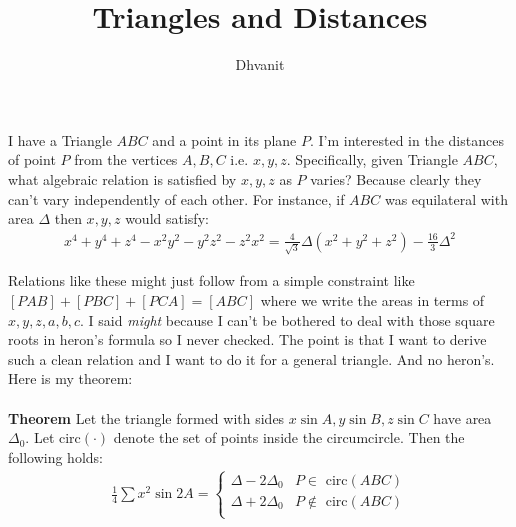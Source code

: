 \documentclass{article}
\title{Triangles and Distances}
\author{Dhvanit}
\begin{document}
\maketitle

\begin{center}
\end{center}
I have a Triangle $ABC$ and a point in its plane $P$. I'm interested in the distances of point $P$ from the vertices $A,B,C$ i.e. $x,y,z$. Specifically, given Triangle $ABC$, what algebraic relation is satisfied by $x,y,z$ as $P$ varies? Because clearly they can't vary independently of each other. For instance, if $ABC$ was equilateral with area $\Delta$ then $x,y,z$ would satisfy:
\begin{align}
    x^4+y^4+z^4 - x^2y^2-y^2z^2-z^2x^2 = \frac{4}{\sqrt{3}}\Delta\left(x^2+y^2+z^2 \right)- \frac{16}{3}\Delta^2
\end{align}

Relations like these might just follow from a simple constraint like $[PAB]+[PBC]+[PCA] = [ABC]$ where we write the areas in terms of $x,y,z,a,b,c$. I said \textit{might} because I can't be bothered to deal with those square roots in heron's formula so I never checked. The point is that I want to derive such a clean relation and I want to do it for a general triangle. And no heron's. Here is my theorem:
\\\\
\textbf{Theorem} Let the triangle formed with sides $x\sin A, y\sin B, z\sin C$ have area $\Delta_0$. Let circ$(\cdot)$ denote the set of points inside the circumcircle. Then the following holds:
\begin{align}
    \frac{1}{4}\sum x^2\sin 2A  = \begin{cases}
        \Delta - 2\Delta_0 & \textrm{$P \in$ circ$(ABC)$} \\
        \Delta + 2\Delta_0 & \textrm{$P\notin$ circ$(ABC)$} \\
    \end{cases}
\end{align}
\end{document}
